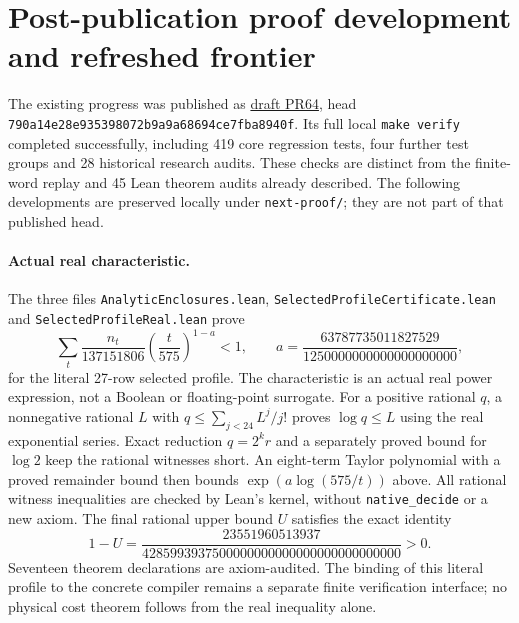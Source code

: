 \documentclass[11pt]{article}
\begin{document}
\section{Post-publication proof development and refreshed frontier}
The existing progress was published as
\href{https://github.com/CrocSwap/integer-mult-bounds/pull/64}{draft PR64},
head \texttt{790a14e28e935398072b9a9a68694ce7fba8940f}.
Its full local \texttt{make verify} completed successfully, including
419 core regression tests, four further test groups and 28 historical
research audits. These checks are distinct from the finite-word replay
and 45 Lean theorem audits already described. The following developments
are preserved locally under \texttt{next-proof/}; they are not part of
that published head.

\paragraph{Actual real characteristic.}
The three files \texttt{AnalyticEnclosures.lean},
\texttt{SelectedProfileCertificate.lean} and
\texttt{SelectedProfileReal.lean} prove
\[
 \sum_{t} \frac{n_t}{137151806}
   \left(\frac{t}{575}\right)^{1-a}<1,
 \qquad a=\frac{63787735011827529}{1250000000000000000000},
\]
for the literal 27-row selected profile. The characteristic is an actual
real power expression, not a Boolean or floating-point surrogate.
For a positive rational $q$, a nonnegative rational $L$ with
$q\le\sum_{j<24}L^j/j!$ proves $\log q\le L$ using the real exponential
series. Exact reduction $q=2^k r$ and a separately proved bound for
$\log 2$ keep the rational witnesses short. An eight-term Taylor
polynomial with a proved remainder bound then bounds
$\exp(a\log(575/t))$ above. All rational witness inequalities are
checked by Lean's kernel, without \texttt{native\_decide} or a new axiom.
The final rational upper bound $U$ satisfies the exact identity
\[
 1-U=\frac{23551960513937}
 {4285993937500000000000000000000000000}>0.
\]
Seventeen theorem declarations are axiom-audited. The binding of this
literal profile to the concrete compiler remains a separate finite
verification interface; no physical cost theorem follows from the real
inequality alone.
\end{document}

